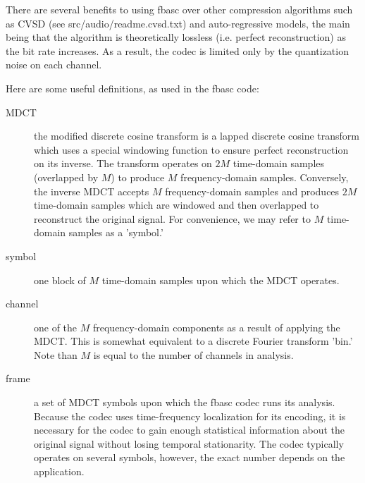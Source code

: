 There are several benefits to using fbasc over other compression algorithms
such as CVSD (see src/audio/readme.cvsd.txt) and auto-regressive models, the
main being that the algorithm is theoretically lossless (i.e. perfect
reconstruction) as the bit rate increases.  As a result, the codec is limited
only by the quantization noise on each channel.

Here are some useful definitions, as used in the fbasc code:

\begin{description}
\item[MDCT]
the modified discrete cosine transform is a lapped discrete cosine
transform which uses a special windowing function to ensure perfect
reconstruction on its inverse. The transform operates on $2M$ time-domain
samples (overlapped by $M$) to produce $M$ frequency-domain samples.
Conversely, the inverse MDCT accepts $M$ frequency-domain samples and
produces $2M$ time-domain samples which are windowed and then overlapped to
reconstruct the original signal.  For convenience, we may refer to $M$
time-domain samples as a 'symbol.'

\item[symbol]
one block of $M$ time-domain samples upon which the MDCT operates.
 
\item[channel]
one of the $M$ frequency-domain components as a result of applying the
MDCT.  This is somewhat equivalent to a discrete Fourier transform 'bin.'
Note than $M$ is equal to the number of channels in analysis.

\item[frame]
a set of MDCT symbols upon which the fbasc codec runs its analysis.
Because the codec uses time-frequency localization for its encoding, it is
necessary for the codec to gain enough statistical information about the
original signal without losing temporal stationarity. The codec typically
operates on several symbols, however, the exact number depends on the
application.
\end{description}

